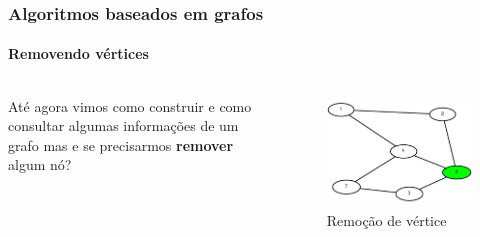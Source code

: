 \begin{frame}
	\frametitle{Algoritmos baseados em grafos}
	\framesubtitle{Removendo vértices}
	\begin{columns}
		\begin{column}{0.4\textwidth}
			\par Até agora vimos como construir e como consultar algumas informações de um grafo mas e se precisarmos \textbf{remover} algum nó?
		\end{column}
		\begin{column}{0.6\textwidth}
			\begin{figure}
				\centering
				\includegraphics[width=0.8\linewidth]{images/remocaoDeVertice00}
				\caption{Remoção de vértice}
				\label{fig:remocaodevertice00}
			\end{figure}
		\end{column}
	\end{columns}
\end{frame}


